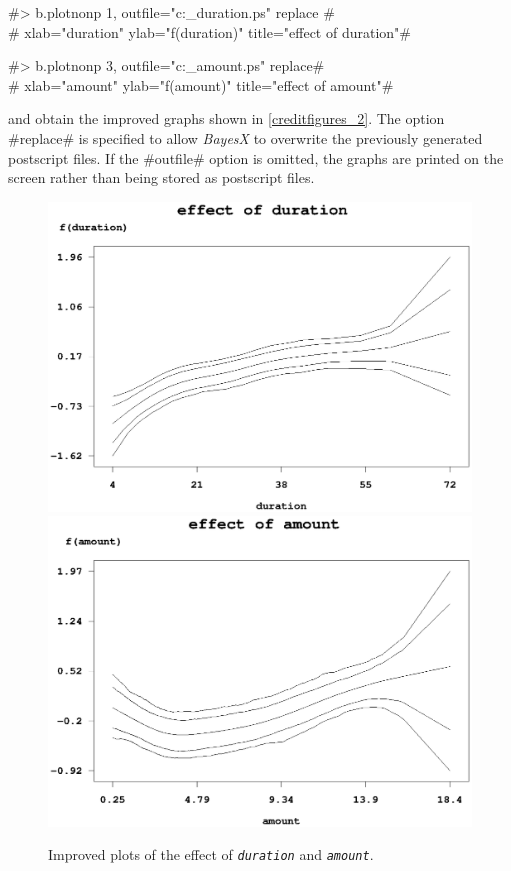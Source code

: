 #> b.plotnonp 1, outfile="c:\results\credit_duration.ps" replace #\\
#  xlab="duration" ylab="f(duration)" title="effect of duration"#

#> b.plotnonp 3, outfile="c:\results\credit_amount.ps" replace# \\
#  xlab="amount" ylab="f(amount)" title="effect of amount"#

and obtain the improved graphs shown in \autoref{creditfigures_2}.
The option #replace# is specified to allow {\em BayesX} to overwrite
the previously generated postscript files. If the #outfile# option
is omitted, the graphs are printed on the screen rather than being
stored as postscript files.

\begin{figure}[ht]
\vspace{0.5cm}
\begin{center}
\includegraphics[scale=0.65]{grafiken/credit_duration_2.ps}

\vspace{0.5cm}
\includegraphics[scale=0.65]{grafiken/credit_amount_2.ps}
\end{center}
{\em\caption{ \label{creditfigures_2} Improved plots of the effect
of {\em\tt duration} and {\em\tt amount}.}}
\end{figure}


